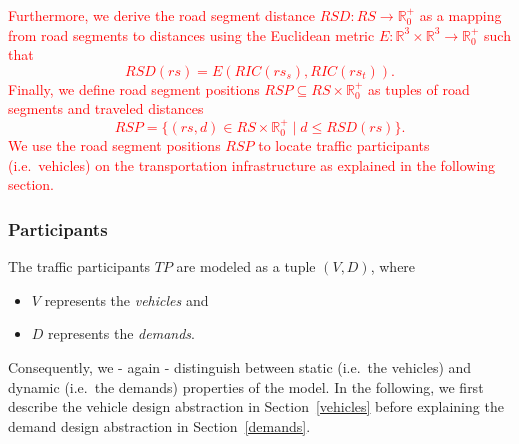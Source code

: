 \textcolor{red}{
Furthermore, we derive the road segment distance $RSD: RS \rightarrow \mathbb{R}_0^+$ as a mapping from road segments to distances using the Euclidean metric $E: \mathbb{R}^3 \times \mathbb{R}^3 \rightarrow \mathbb{R}_0^+$ such that
\[
	RSD(rs) = E(RIC(rs_s), RIC(rs_t)) \textrm{.}
\]
Finally, we define road segment positions $RSP \subseteq RS \times \mathbb{R}_0^+$ as tuples of road segments and traveled distances
\[
	RSP = \{(rs, d) \in RS \times \mathbb{R}_0^+ \mid d \leq RSD(rs)\} \textrm{.}
\]
We use the road segment positions $RSP$ to locate traffic participants (i.e.\ vehicles) on the transportation infrastructure as explained in the following section. 
}

\subsubsection{Participants}
\label{participants}

The traffic participants $TP$ are modeled as a tuple $(V, D)$, where
\begin{itemize}
	\item $V$ represents the \textit{vehicles} and
	\item $D$ represents the \textit{demands}.
\end{itemize}
Consequently, we - again - distinguish between static (i.e.\ the vehicles) and dynamic (i.e.\ the demands) properties of the model. In the following, we first describe the vehicle design abstraction in Section~\ref{vehicles} before explaining the demand design abstraction in Section~\ref{demands}.

